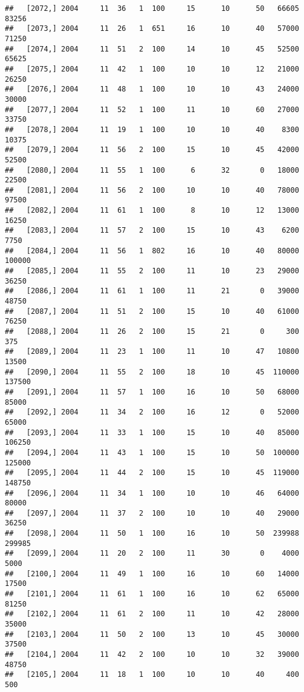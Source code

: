 \documentclass{article}\usepackage[]{graphicx}\usepackage[]{color}
\makeatletter
\newenvironment{kframe}{%
 \def\at@end@of@kframe{}%
 \ifinner\ifhmode%
  \def\at@end@of@kframe{\end{minipage}}%
  \begin{minipage}{\columnwidth}%
 \fi\fi%
 \def\FrameCommand##1{\hskip\@totalleftmargin \hskip-\fboxsep
 \colorbox{shadecolor}{##1}\hskip-\fboxsep
     \hskip-\linewidth \hskip-\@totalleftmargin \hskip\columnwidth}%
 \MakeFramed {\advance\hsize-\width
   \@totalleftmargin\z@ \linewidth\hsize
   \@setminipage}}%
 {\par\unskip\endMakeFramed%
 \at@end@of@kframe}
\newenvironment{knitrout}{}{} %
\makeatother
\begin{document}
\begin{knitrout}
\begin{kframe}
\begin{verbatim}
##   [2072,] 2004     11  36   1  100     15      10      50   66605   83256
##   [2073,] 2004     11  26   1  651     16      10      40   57000   71250
##   [2074,] 2004     11  51   2  100     14      10      45   52500   65625
##   [2075,] 2004     11  42   1  100     10      10      12   21000   26250
##   [2076,] 2004     11  48   1  100     10      10      43   24000   30000
##   [2077,] 2004     11  52   1  100     11      10      60   27000   33750
##   [2078,] 2004     11  19   1  100     10      10      40    8300   10375
##   [2079,] 2004     11  56   2  100     15      10      45   42000   52500
##   [2080,] 2004     11  55   1  100      6      32       0   18000   22500
##   [2081,] 2004     11  56   2  100     10      10      40   78000   97500
##   [2082,] 2004     11  61   1  100      8      10      12   13000   16250
##   [2083,] 2004     11  57   2  100     15      10      43    6200    7750
##   [2084,] 2004     11  56   1  802     16      10      40   80000  100000
##   [2085,] 2004     11  55   2  100     11      10      23   29000   36250
##   [2086,] 2004     11  61   1  100     11      21       0   39000   48750
##   [2087,] 2004     11  51   2  100     15      10      40   61000   76250
##   [2088,] 2004     11  26   2  100     15      21       0     300     375
##   [2089,] 2004     11  23   1  100     11      10      47   10800   13500
##   [2090,] 2004     11  55   2  100     18      10      45  110000  137500
##   [2091,] 2004     11  57   1  100     16      10      50   68000   85000
##   [2092,] 2004     11  34   2  100     16      12       0   52000   65000
##   [2093,] 2004     11  33   1  100     15      10      40   85000  106250
##   [2094,] 2004     11  43   1  100     15      10      50  100000  125000
##   [2095,] 2004     11  44   2  100     15      10      45  119000  148750
##   [2096,] 2004     11  34   1  100     10      10      46   64000   80000
##   [2097,] 2004     11  37   2  100     10      10      40   29000   36250
##   [2098,] 2004     11  50   1  100     16      10      50  239988  299985
##   [2099,] 2004     11  20   2  100     11      30       0    4000    5000
##   [2100,] 2004     11  49   1  100     16      10      60   14000   17500
##   [2101,] 2004     11  61   1  100     16      10      62   65000   81250
##   [2102,] 2004     11  61   2  100     11      10      42   28000   35000
##   [2103,] 2004     11  50   2  100     13      10      45   30000   37500
##   [2104,] 2004     11  42   2  100     10      10      32   39000   48750
##   [2105,] 2004     11  18   1  100     10      10      40     400     500

\end{verbatim}
\end{kframe}
\end{knitrout}
\end{document}
